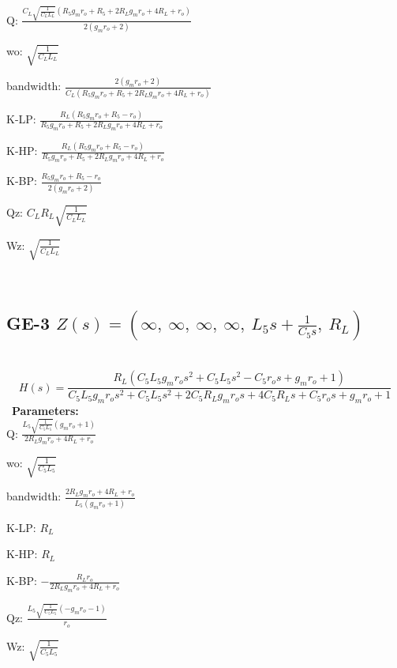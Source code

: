 \documentclass{article}
\begin{document}
Q: $\frac{C_{L} \sqrt{\frac{1}{C_{L} L_{L}}} \left(R_{5} g_{m} r_{o} + R_{5} + 2 R_{L} g_{m} r_{o} + 4 R_{L} + r_{o}\right)}{2 \left(g_{m} r_{o} + 2\right)}$\ 

wo: $\sqrt{\frac{1}{C_{L} L_{L}}}$\ 

bandwidth: $\frac{2 \left(g_{m} r_{o} + 2\right)}{C_{L} \left(R_{5} g_{m} r_{o} + R_{5} + 2 R_{L} g_{m} r_{o} + 4 R_{L} + r_{o}\right)}$\ 

K-LP: $\frac{R_{L} \left(R_{5} g_{m} r_{o} + R_{5} - r_{o}\right)}{R_{5} g_{m} r_{o} + R_{5} + 2 R_{L} g_{m} r_{o} + 4 R_{L} + r_{o}}$\ 

K-HP: $\frac{R_{L} \left(R_{5} g_{m} r_{o} + R_{5} - r_{o}\right)}{R_{5} g_{m} r_{o} + R_{5} + 2 R_{L} g_{m} r_{o} + 4 R_{L} + r_{o}}$\ 

K-BP: $\frac{R_{5} g_{m} r_{o} + R_{5} - r_{o}}{2 \left(g_{m} r_{o} + 2\right)}$\ 

Qz: $C_{L} R_{L} \sqrt{\frac{1}{C_{L} L_{L}}}$\ 

Wz: $\sqrt{\frac{1}{C_{L} L_{L}}}$\ 

\ 

\subsection{GE-3 $Z(s) = \left( \infty, \  \infty, \  \infty, \  \infty, \  L_{5} s + \frac{1}{C_{5} s}, \  R_{L}\right)$ } \ 
\textbf{\[H(s) = \frac{R_{L} \left(C_{5} L_{5} g_{m} r_{o} s^{2} + C_{5} L_{5} s^{2} - C_{5} r_{o} s + g_{m} r_{o} + 1\right)}{C_{5} L_{5} g_{m} r_{o} s^{2} + C_{5} L_{5} s^{2} + 2 C_{5} R_{L} g_{m} r_{o} s + 4 C_{5} R_{L} s + C_{5} r_{o} s + g_{m} r_{o} + 1}\] } \ 
\textbf{Parameters:}\\ 

Q: $\frac{L_{5} \sqrt{\frac{1}{C_{5} L_{5}}} \left(g_{m} r_{o} + 1\right)}{2 R_{L} g_{m} r_{o} + 4 R_{L} + r_{o}}$\ 

wo: $\sqrt{\frac{1}{C_{5} L_{5}}}$\ 

bandwidth: $\frac{2 R_{L} g_{m} r_{o} + 4 R_{L} + r_{o}}{L_{5} \left(g_{m} r_{o} + 1\right)}$\ 

K-LP: $R_{L}$\ 

K-HP: $R_{L}$\ 

K-BP: $- \frac{R_{L} r_{o}}{2 R_{L} g_{m} r_{o} + 4 R_{L} + r_{o}}$\ 

Qz: $\frac{L_{5} \sqrt{\frac{1}{C_{5} L_{5}}} \left(- g_{m} r_{o} - 1\right)}{r_{o}}$\ 

Wz: $\sqrt{\frac{1}{C_{5} L_{5}}}$\ 
\end{document}
